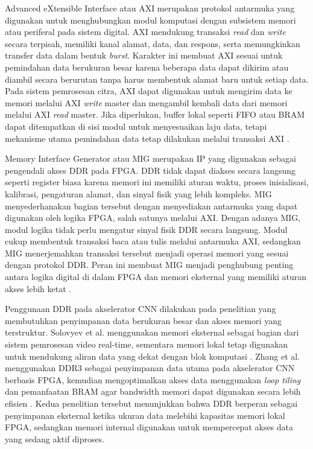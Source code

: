   Advanced eXtensible Interface atau AXI merupakan protokol antarmuka yang digunakan
  untuk menghubungkan modul komputasi dengan subsistem memori atau periferal pada
  sistem digital. AXI mendukung transaksi \emph{read} dan \emph{write} secara
  terpisah, memiliki kanal alamat, data, dan respons, serta memungkinkan transfer
  data dalam bentuk \emph{burst}. Karakter ini membuat AXI sesuai untuk pemindahan
  data berukuran besar karena beberapa data dapat dikirim atau diambil secara
  berurutan tanpa harus membentuk alamat baru untuk setiap data. Pada sistem
  pemrosesan citra, AXI dapat digunakan untuk mengirim data ke memori melalui AXI
  \emph{write} master dan mengambil kembali data dari memori melalui AXI
  \emph{read} master. Jika diperlukan, buffer lokal seperti FIFO atau BRAM dapat
  ditempatkan di sisi modul untuk menyesuaikan laju data, tetapi mekanisme utama
  pemindahan data tetap dilakukan melalui transaksi AXI \cite{ARMAMBAAXI4Spec}.

  Memory Interface Generator atau MIG merupakan IP yang digunakan sebagai
  pengendali akses DDR pada FPGA. DDR tidak dapat diakses secara langsung seperti
  register biasa karena memori ini memiliki aturan waktu, proses inisialisasi,
  kalibrasi, pengaturan alamat, dan sinyal fisik yang lebih kompleks. MIG
  menyederhanakan bagian tersebut dengan menyediakan antarmuka yang dapat digunakan
  oleh logika FPGA, salah satunya melalui AXI. Dengan adanya MIG, modul logika
  tidak perlu mengatur sinyal fisik DDR secara langsung. Modul cukup membentuk
  transaksi baca atau tulis melalui antarmuka AXI, sedangkan MIG menerjemahkan
  transaksi tersebut menjadi operasi memori yang sesuai dengan protokol DDR. Peran
  ini membuat MIG menjadi penghubung penting antara logika digital di dalam FPGA
  dan memori eksternal yang memiliki aturan akses lebih ketat \cite{XilinxMIGUG586}.

  Penggunaan DDR pada akselerator CNN dilakukan pada penelitian yang membutuhkan
  penyimpanan data berukuran besar dan akses memori yang terstruktur. Solovyev et
  al. menggunakan memori eksternal sebagai bagian dari sistem pemrosesan video
  real-time, sementara memori lokal tetap digunakan untuk mendukung aliran data
  yang dekat dengan blok komputasi \cite{Solovyev2019FixedPointCNN}. Zhang et al.
  menggunakan DDR3 sebagai penyimpanan data utama pada akselerator CNN berbasis
  FPGA, kemudian mengoptimalkan akses data menggunakan \emph{loop tiling} dan
  pemanfaatan BRAM agar bandwidth memori dapat digunakan secara lebih efisien
  \cite{Zhang2015OptimizingCNNFPGA}. Kedua penelitian tersebut menunjukkan bahwa
  DDR berperan sebagai penyimpanan eksternal ketika ukuran data melebihi kapasitas
  memori lokal FPGA, sedangkan memori internal digunakan untuk mempercepat akses
  data yang sedang aktif diproses.

